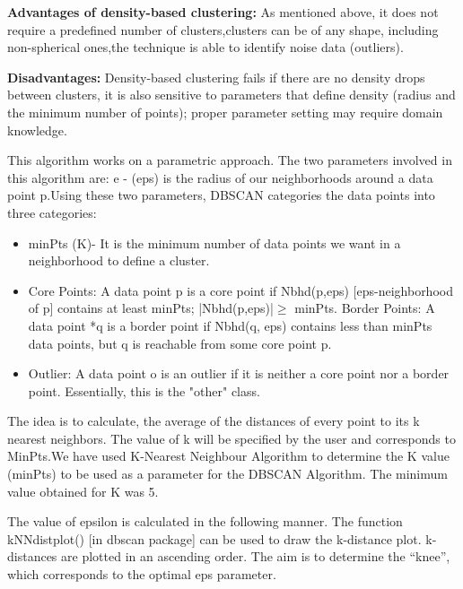 \documentclass{article}
\begin{document}
\textbf{Advantages of density-based clustering:}
\newline
As mentioned above, it does not require a predefined number of clusters,clusters can be of any shape, including non-spherical ones,the technique is able to identify noise data (outliers).\newline

\newline

\textbf{Disadvantages:}
\newline
Density-based clustering fails if there are no density drops between clusters, it is also sensitive to parameters that define density (radius and the minimum number of points); proper parameter setting may require domain knowledge.

This algorithm works on a parametric approach. The two parameters involved in this algorithm are:
e - (eps) is the radius of our neighborhoods around a data point p.Using these two parameters, DBSCAN categories the data points into three categories:


\begin{itemize}
\item  minPts (K)- It is the minimum number of data points we want in a neighborhood to define a cluster.
\item Core Points: A data point p is a core point if Nbhd(p,eps) [eps-neighborhood of p] contains at least minPts; \mathopen|Nbhd(p,eps)|$\geq$ minPts.
Border Points: A data point *q is a border point if Nbhd(q, eps) contains less than minPts data points, but q is reachable from some core point p.
\item Outlier: A data point o is an outlier if it is neither a core point nor a border point. Essentially, this is the "other" class. \newline
\end{itemize}
The idea is to calculate, the average of the distances of every point to its k nearest neighbors. The value of k will be specified by the user and corresponds to MinPts.We have used K-Nearest Neighbour Algorithm to determine the K value (minPts) to be used as a parameter for the DBSCAN Algorithm. The minimum value obtained for K was 5. \newline

The value of epsilon is calculated in the following manner. The function kNNdistplot() [in dbscan package] can be used to draw the k-distance plot. k-distances are plotted in an ascending order. The aim is to determine the “knee”, which corresponds to the optimal eps parameter. \newline
\end{document}
